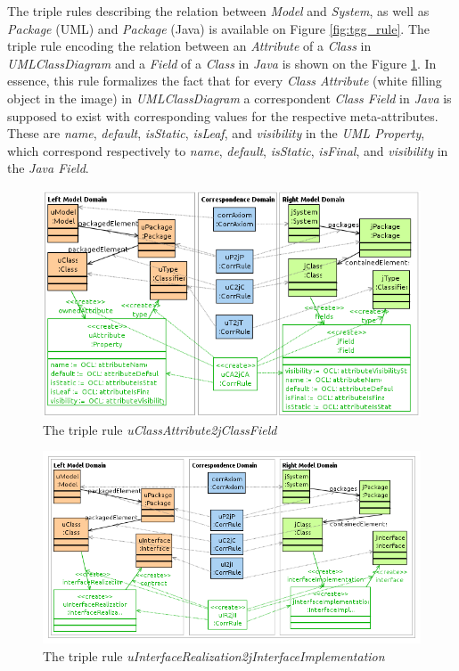 \documentclass[tuberlin,cic,tc,english,noabntcite]{iiufrgs}
\begin{document}
The triple rules describing the relation between \emph{Model} and \emph{System}, as well as \emph{Package} (UML) and \emph{Package} (Java) is available on Figure \ref{fig:tgg_rule}. The triple rule encoding the relation between an \emph{Attribute} of a \emph{Class} in \emph{UMLClassDiagram} and a \emph{Field} of a \emph{Class} in \emph{Java} is shown on the Figure \ref{fig:uCAttribute2jCField}. In essence, this rule formalizes the fact that for every \emph{Class Attribute} (white filling object in the image) in \emph{UMLClassDiagram} a correspondent \emph{Class Field} in \emph{Java} is supposed to exist with corresponding values for the respective meta-attributes. These are \emph{name}, \emph{default}, \emph{isStatic}, \emph{isLeaf}, and \emph{visibility} in the \emph{UML Property}, which correspond respectively to \emph{name}, \emph{default}, \emph{isStatic}, \emph{isFinal}, and \emph{visibility} in the \emph{Java Field}.

\begin{figure}[H]
    \caption{The triple rule \emph{uClassAttribute2jClassField}}
    \begin{center}
       	\includegraphics[width=.7\textwidth]{uCAttribute2jCField}
    \end{center}
    \label{fig:uCAttribute2jCField}
\end{figure}

\begin{figure}[H]
    \caption{The triple rule \emph{uInterfaceRealization2jInterfaceImplementation}}
    \begin{center}
       	\includegraphics[width=.7\textwidth]{uIRealization2jIImplementation}
    \end{center}
    \label{fig:uIRealization2jIImplementation}
\end{figure}
\end{document}

